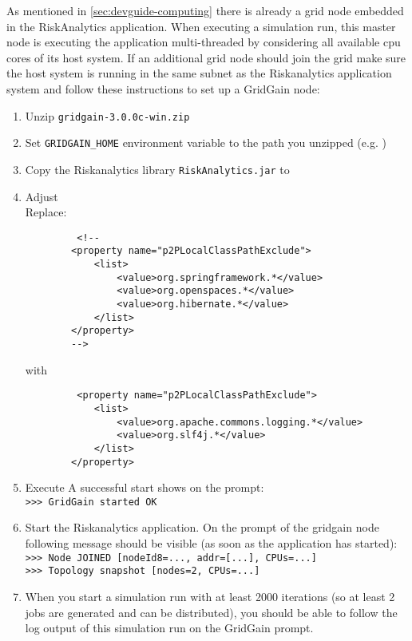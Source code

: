 As mentioned in \ref{sec:devguide-computing} there is already a grid node embedded in the RiskAnalytics application.
When executing a simulation run, this master node is executing the application multi-threaded by considering all available cpu cores
of its host system.
If an additional grid node should join the grid make sure the host system is running in the same subnet as
the Riskanalytics application system and follow these instructions to set up a GridGain node:
\begin{enumerate}
 \item Unzip \texttt{gridgain-3.0.0c-win.zip}
 \item Set \texttt{GRIDGAIN\_HOME} environment variable to the path you unzipped (e.g. \texttt{})
 \item Copy the Riskanalytics library \texttt{RiskAnalytics.jar} to \\ \texttt{}
 \item Adjust \texttt{}\\
Replace:
\begin{lstlisting}
         <!--
        <property name="p2PLocalClassPathExclude">
            <list>
                <value>org.springframework.*</value>
                <value>org.openspaces.*</value>
                <value>org.hibernate.*</value>
            </list>
        </property>
        -->
\end{lstlisting}

with
\begin{lstlisting}
         <property name="p2PLocalClassPathExclude">
            <list>
                <value>org.apache.commons.logging.*</value>
                <value>org.slf4j.*</value>
            </list>
        </property>
\end{lstlisting}

\item Execute 
A successful start shows on the prompt:\\
\texttt{>>> GridGain started OK}
\item Start the Riskanalytics application. On the prompt of the gridgain node following message should be visible (as soon
as the application has started): \\
\texttt{>>> Node JOINED [nodeId8=..., addr=[...], CPUs=...]}\\
\texttt{>>> Topology snapshot [nodes=2, CPUs=...]}

\item When you start a simulation run with at least 2000 iterations (so at least 2 jobs are generated and can be distributed), you should be able to follow the log output of this simulation run
on the GridGain prompt.

\end{enumerate}
